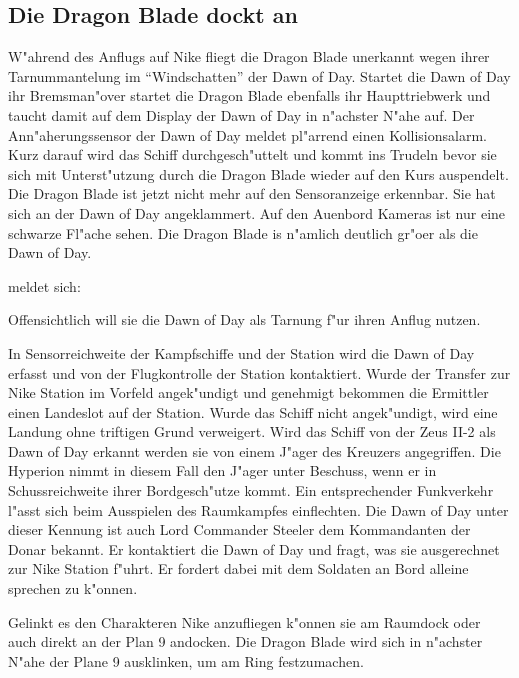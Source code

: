 \subsection{Die Dragon Blade dockt an}
W"ahrend des Anflugs auf Nike fliegt die Dragon Blade unerkannt wegen ihrer Tarnummantelung im "`Windschatten"' der Dawn of Day. Startet die Dawn of Day ihr Bremsman"over startet die Dragon Blade ebenfalls ihr Haupttriebwerk und taucht damit auf dem Display der Dawn of Day in n"achster N"ahe auf. Der Ann"aherungssensor der Dawn of Day meldet pl"arrend einen Kollisionsalarm. Kurz darauf wird das Schiff durchgesch"uttelt und kommt ins Trudeln bevor sie sich mit Unterst"utzung durch die Dragon Blade wieder auf den Kurs auspendelt. Die Dragon Blade ist jetzt nicht mehr auf den Sensoranzeige erkennbar. Sie hat sich an der Dawn of Day angeklammert. Auf den Au\3enbord Kameras ist nur eine schwarze Fl"ache sehen. Die Dragon Blade is n"amlich deutlich gr"o\3er als die Dawn of Day.

\xl{} meldet sich:


Offensichtlich will sie die Dawn of Day als Tarnung f"ur ihren Anflug nutzen.

In Sensorreichweite der Kampfschiffe und der Station wird die Dawn of Day erfasst und von der Flugkontrolle der Station kontaktiert. Wurde der Transfer zur Nike Station im Vorfeld angek"undigt und genehmigt bekommen die Ermittler einen Landeslot auf der Station. Wurde das Schiff nicht angek"undigt, wird eine Landung ohne triftigen Grund verweigert. Wird das Schiff von der Zeus II-2 als Dawn of Day erkannt werden sie von einem J"ager des Kreuzers angegriffen. Die Hyperion nimmt in diesem Fall den J"ager unter Beschuss, wenn er in Schussreichweite ihrer Bordgesch"utze kommt. Ein entsprechender Funkverkehr l"asst sich beim Ausspielen des Raumkampfes einflechten. Die Dawn of Day unter dieser Kennung ist auch Lord Commander Steeler dem Kommandanten der Donar bekannt. Er kontaktiert die Dawn of Day und fragt, was sie ausgerechnet zur Nike Station f"uhrt. Er fordert dabei mit dem Soldaten an Bord alleine sprechen zu k"onnen.

Gelinkt es den Charakteren Nike anzufliegen k"onnen sie am Raumdock oder auch direkt an der Plan 9 andocken. Die Dragon Blade wird sich in n"achster N"ahe der Plane 9 ausklinken, um am Ring festzumachen.

